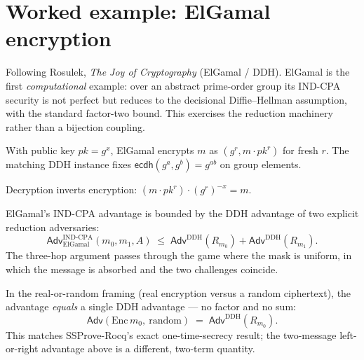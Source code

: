 \chapter{Worked example: ElGamal encryption}

Following Rosulek, \emph{The Joy of Cryptography} (ElGamal / DDH). ElGamal is the
first \emph{computational} example: over an abstract prime-order group its IND-CPA
security is not perfect but reduces to the decisional Diffie--Hellman assumption,
with the standard factor-two bound. This exercises the reduction machinery rather
than a bijection coupling.

\begin{definition}
  \label{def:elgamal}
  \leanok
  With public key $\mathit{pk} = g^{x}$, ElGamal encrypts $m$ as $(g^{r}, m \cdot
  \mathit{pk}^{r})$ for fresh $r$. The matching DDH instance fixes
  $\mathsf{ecdh}(g^{a}, g^{b}) = g^{ab}$ on group elements.
\end{definition}

\begin{theorem}[Correctness]
  \label{thm:elgamal-correct}
  \leanok
  Decryption inverts encryption: $(m \cdot \mathit{pk}^{r}) \cdot (g^{r})^{-x} =
  m$.
\end{theorem}

\begin{theorem}
  \label{thm:elgamal-ddh}
  \leanok
  ElGamal's IND-CPA advantage is bounded by the DDH advantage of two explicit
  reduction adversaries:
  \[
    \mathsf{Adv}^{\mathrm{IND\text{-}CPA}}_{\mathrm{ElGamal}}(m_0, m_1, A) \;\le\;
    \mathsf{Adv}^{\mathrm{DDH}}(R_{m_0}) + \mathsf{Adv}^{\mathrm{DDH}}(R_{m_1}).
  \]
  The three-hop argument passes through the game where the mask is uniform, in
  which the message is absorbed and the two challenges coincide.
\end{theorem}

\begin{theorem}
  \label{thm:elgamal-eq-ddh}
  \leanok
  In the real-or-random framing (real encryption versus a random ciphertext), the
  advantage \emph{equals} a single DDH advantage --- no factor and no sum:
  \[
    \mathsf{Adv}(\mathrm{Enc}\,m_0,\ \mathrm{random}) \;=\;
    \mathsf{Adv}^{\mathrm{DDH}}(R_{m_0}).
  \]
  This matches SSProve-Rocq's exact one-time-secrecy result; the two-message
  left-or-right advantage above is a different, two-term quantity.
\end{theorem}

